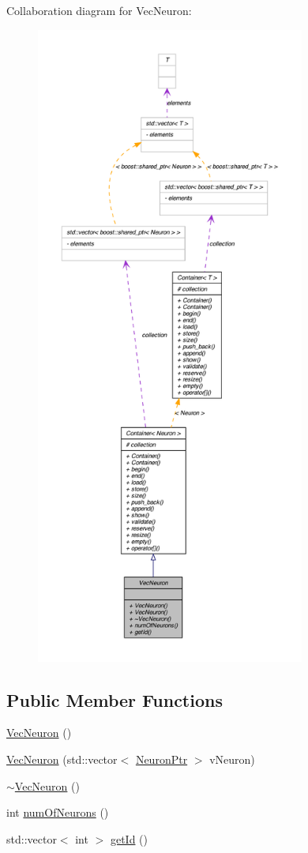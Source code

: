 Collaboration diagram for VecNeuron:
\nopagebreak
\begin{figure}[H]
\begin{center}
\leavevmode
\includegraphics[height=600pt]{class_vec_neuron__coll__graph}
\end{center}
\end{figure}
\subsection*{Public Member Functions}
\begin{DoxyCompactItemize}
\item 
\hyperlink{class_vec_neuron_ae0bbf203eaef81c45facbee57b463b37}{VecNeuron} ()
\item 
\hyperlink{class_vec_neuron_ae7bc02590cd22902220fbcd7949be0e7}{VecNeuron} (std::vector$<$ \hyperlink{_a_m_o_r_e_8h_ac1ea936c2c7728eb382278131652fef4}{NeuronPtr} $>$ vNeuron)
\item 
\hyperlink{class_vec_neuron_a6bf0db759d6940f4e69e0da4a4c4ea98}{$\sim$VecNeuron} ()
\item 
int \hyperlink{class_vec_neuron_a3bade484bdea1bec20aa6bb0b977d259}{numOfNeurons} ()
\item 
std::vector$<$ int $>$ \hyperlink{class_vec_neuron_ab9cf35c1f6b087e0cabfe5294186397c}{getId} ()
\end{DoxyCompactItemize}


